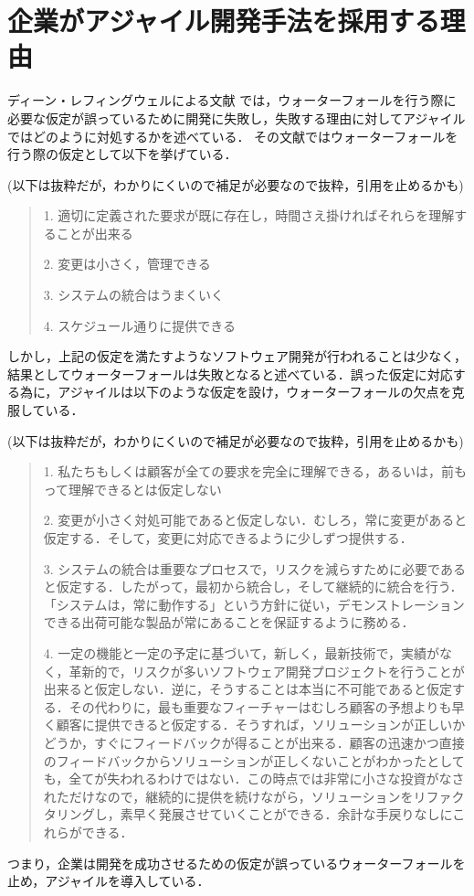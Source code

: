 \section{企業がアジャイル開発手法を採用する理由}

ディーン・レフィングウェルによる文献 \cite{leffingwell2010アジャイル開発の本質とスケールアップ}では，ウォーターフォールを行う際に必要な仮定が誤っているために開発に失敗し，失敗する理由に対してアジャイルではどのように対処するかを述べている．
その文献ではウォーターフォールを行う際の仮定として以下を挙げている．

(以下は抜粋だが，わかりにくいので補足が必要なので抜粋，引用を止めるかも)

\begin{quote}
  1. 適切に定義された要求が既に存在し，時間さえ掛ければそれらを理解することが出来る

  2. 変更は小さく，管理できる

  3. システムの統合はうまくいく

  4. スケジュール通りに提供できる
\end{quote}

しかし，上記の仮定を満たすようなソフトウェア開発が行われることは少なく，結果としてウォーターフォールは失敗となると述べている．誤った仮定に対応する為に，アジャイルは以下のような仮定を設け，ウォーターフォールの欠点を克服している．

(以下は抜粋だが，わかりにくいので補足が必要なので抜粋，引用を止めるかも)

\begin{quote}
  1. 私たちもしくは顧客が全ての要求を完全に理解できる，あるいは，前もって理解できるとは仮定しない

  2. 変更が小さく対処可能であると仮定しない．むしろ，常に変更があると仮定する．そして，変更に対応できるように少しずつ提供する．

  3. システムの統合は重要なプロセスで，リスクを減らすために必要であると仮定する．したがって，最初から統合し，そして継続的に統合を行う．「システムは，常に動作する」という方針に従い，デモンストレーションできる出荷可能な製品が常にあることを保証するように務める．

  4. 一定の機能と一定の予定に基づいて，新しく，最新技術で，実績がなく，革新的で，リスクが多いソフトウェア開発プロジェクトを行うことが出来ると仮定しない．逆に，そうすることは本当に不可能であると仮定する．その代わりに，最も重要なフィーチャーはむしろ顧客の予想よりも早く顧客に提供できると仮定する．そうすれば，ソリューションが正しいかどうか，すぐにフィードバックが得ることが出来る．顧客の迅速かつ直接のフィードバックからソリューションが正しくないことがわかったとしても，全てが失われるわけではない．この時点では非常に小さな投資がなされただけなので，継続的に提供を続けながら，ソリューションをリファクタリングし，素早く発展させていくことができる．余計な手戻りなしにこれらができる．

\end{quote}

つまり，企業は開発を成功させるための仮定が誤っているウォーターフォールを止め，アジャイルを導入している．
